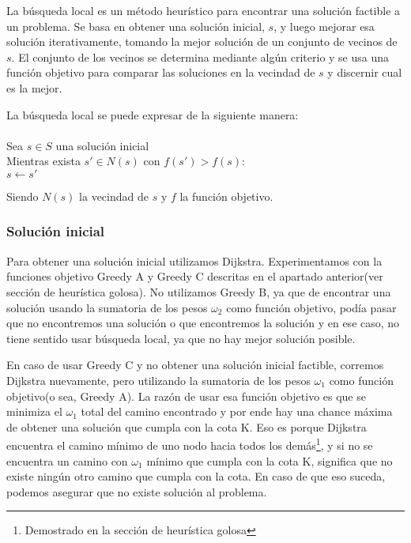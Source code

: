 
La búsqueda local es un método heurístico para encontrar una solución factible a un problema. Se basa en obtener una solución inicial, $s$, y luego mejorar esa solución iterativamente, tomando la mejor solución de un conjunto de vecinos de $s$. El conjunto de los vecinos se determina mediante algún criterio y se usa una función objetivo para comparar las soluciones en la vecindad de $s$ y discernir cual es la mejor.

La búsqueda local se puede expresar de la siguiente manera:\\\\
\hspace*{1 cm} Sea $s \in S$ una solución inicial\\
\hspace*{1 cm} Mientras exista $s' \in N(s)$ con $f(s') > f(s)$:\\
\hspace*{2 cm} $s \leftarrow s'$

Siendo $N(s)$ la vecindad de $s$ y $f$ la función objetivo.

\subsubsection{Solución inicial}

Para obtener una solución inicial utilizamos Dijkstra. Experimentamos con la funciones objetivo Greedy A y Greedy C descritas en el apartado anterior(ver sección de heurística golosa). No utilizamos Greedy B, ya que de encontrar una solución usando la sumatoria de los pesos $\omega_2$ como función objetivo, podía pasar que no encontremos una solución o que encontremos la solución y en ese caso, no tiene sentido usar búsqueda local, ya que no hay mejor solución posible.

En caso de usar Greedy C y no obtener una solución inicial factible, corremos Dijkstra nuevamente, pero utilizando la sumatoria de los pesos $\omega_1$ como función objetivo(o sea, Greedy A). La razón de usar esa función objetivo es que se minimiza el $\omega_1$ total del camino encontrado y por ende hay una chance máxima de obtener una solución que cumpla con la cota K. Eso es porque Dijkstra encuentra el camino mínimo de uno nodo hacia todos los demás\footnote{Demostrado en la sección de heurística golosa}, y si no se encuentra un camino con $\omega_1$ mínimo que cumpla con la cota K, significa que no existe ningún otro camino que cumpla con la cota. En caso de que eso suceda, podemos asegurar que no existe solución al problema.

